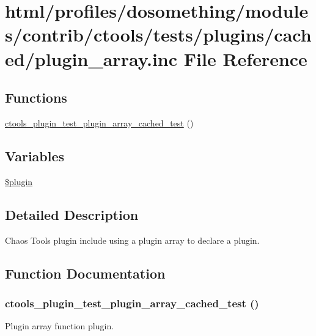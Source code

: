 \hypertarget{cached_2plugin__array_8inc}{
\section{html/profiles/dosomething/modules/contrib/ctools/tests/plugins/cached/plugin\_\-array.inc File Reference}
\label{cached_2plugin__array_8inc}
}
\subsection*{Functions}
\begin{DoxyCompactItemize}
\item 
\hyperlink{cached_2plugin__array_8inc_aca0819a5a72810cf021c3ac1d437dc4a}{ctools\_\-plugin\_\-test\_\-plugin\_\-array\_\-cached\_\-test} ()
\end{DoxyCompactItemize}
\subsection*{Variables}
\begin{DoxyCompactItemize}
\item 
\hyperlink{cached_2plugin__array_8inc_ada8a7130088351710bb02ed622d6bf65}{\$plugin}
\end{DoxyCompactItemize}


\subsection{Detailed Description}
Chaos Tools plugin include using a plugin array to declare a plugin. 

\subsection{Function Documentation}
\hypertarget{cached_2plugin__array_8inc_aca0819a5a72810cf021c3ac1d437dc4a}{
\subsubsection[{ctools\_\-plugin\_\-test\_\-plugin\_\-array\_\-cached\_\-test}]{\setlength{\rightskip}{0pt plus 5cm}ctools\_\-plugin\_\-test\_\-plugin\_\-array\_\-cached\_\-test ()}}
\label{cached_2plugin__array_8inc_aca0819a5a72810cf021c3ac1d437dc4a}
Plugin array function plugin. 

